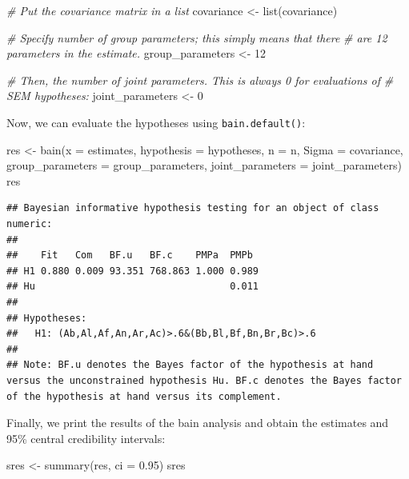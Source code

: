 \documentclass[
]{book}
\newenvironment{Shaded}{\begin{snugshade}}{\end{snugshade}}
\newcommand{\AttributeTok}[1]{\textcolor[rgb]{0.77,0.63,0.00}{#1}}
\newcommand{\CommentTok}[1]{\textcolor[rgb]{0.56,0.35,0.01}{\textit{#1}}}
\newcommand{\DecValTok}[1]{\textcolor[rgb]{0.00,0.00,0.81}{#1}}
\newcommand{\FloatTok}[1]{\textcolor[rgb]{0.00,0.00,0.81}{#1}}
\newcommand{\FunctionTok}[1]{\textcolor[rgb]{0.00,0.00,0.00}{#1}}
\newcommand{\NormalTok}[1]{#1}
\newcommand{\OtherTok}[1]{\textcolor[rgb]{0.56,0.35,0.01}{#1}}
\begin{document}
\begin{Shaded}
\begin{Highlighting}[]
\CommentTok{\# Put the covariance matrix in a list}
\NormalTok{covariance }\OtherTok{\textless{}{-}} \FunctionTok{list}\NormalTok{(covariance)}

\CommentTok{\# Specify number of group parameters; this simply means that there }
\CommentTok{\# are 12 parameters in the estimate.}
\NormalTok{group\_parameters }\OtherTok{\textless{}{-}} \DecValTok{12}

\CommentTok{\# Then, the number of joint parameters. This is always 0 for evaluations of}
\CommentTok{\# SEM hypotheses:}
\NormalTok{joint\_parameters }\OtherTok{\textless{}{-}} \DecValTok{0}
\end{Highlighting}
\end{Shaded}

Now, we can evaluate the hypotheses using \texttt{bain.default()}:

\begin{Shaded}
\begin{Highlighting}[]
\NormalTok{res }\OtherTok{\textless{}{-}} \FunctionTok{bain}\NormalTok{(}\AttributeTok{x =}\NormalTok{ estimates,}
            \AttributeTok{hypothesis =}\NormalTok{ hypotheses,}
            \AttributeTok{n =}\NormalTok{ n,}
            \AttributeTok{Sigma =}\NormalTok{ covariance,}
            \AttributeTok{group\_parameters =}\NormalTok{ group\_parameters,}
            \AttributeTok{joint\_parameters =}\NormalTok{ joint\_parameters)}
\NormalTok{res}
\end{Highlighting}
\end{Shaded}

\begin{verbatim}
## Bayesian informative hypothesis testing for an object of class numeric:
## 
##    Fit   Com   BF.u   BF.c    PMPa  PMPb 
## H1 0.880 0.009 93.351 768.863 1.000 0.989
## Hu                                  0.011
## 
## Hypotheses:
##   H1: (Ab,Al,Af,An,Ar,Ac)>.6&(Bb,Bl,Bf,Bn,Br,Bc)>.6
## 
## Note: BF.u denotes the Bayes factor of the hypothesis at hand versus the unconstrained hypothesis Hu. BF.c denotes the Bayes factor of the hypothesis at hand versus its complement.
\end{verbatim}

Finally, we print the results of the bain analysis and obtain the estimates and 95\%
central credibility intervals:

\begin{Shaded}
\begin{Highlighting}[]
\NormalTok{sres }\OtherTok{\textless{}{-}} \FunctionTok{summary}\NormalTok{(res, }\AttributeTok{ci =} \FloatTok{0.95}\NormalTok{)}
\NormalTok{sres}
\end{Highlighting}
\end{Shaded}
\end{document}
